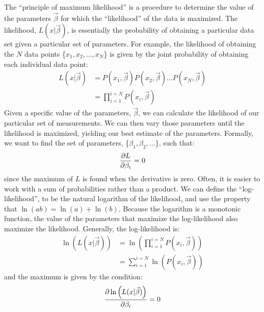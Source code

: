The ``principle of maximum likelihood'' is a procedure to determine the value of the parameters $\vec\beta$ for which the ``likelihood'' of the data is maximized. The likelihood, $L(x|\vec\beta)$, is essentially the probability of obtaining a particular data set given a particular set of parameters. For example, the likelihood of obtaining the $N$ data points \{$x_1, x_2, \dots,x_N$\} is given by the joint probability of obtaining each individual data point:
\begin{align}
L(x|\vec\beta)&=P(x_1,\vec\beta)P(x_2,\vec\beta)\dots P(x_N,\vec\beta)\nonumber\\
&=\prod_{i=1}^{i=N}P(x_i,\vec\beta)
\end{align}
Given a specific value of the parameters, $\vec\beta$, we can calculate the likelihood of our particular set of measurements. We can then vary those parameters until the likelihood is maximized, yielding our best estimate of the parameters. Formally, we want to find the set of parameters, \{$\beta_1,\beta_2,\dots$\}, such that:
\begin{align}
\frac{\partial L}{\partial \beta_i}=0
\end{align}
since the maximum of $L$ is found when the derivative is zero. Often, it is easier to work with a sum of probabilities rather than a product. We can define the ``log-likelihood'', to be the natural logarithm of the likelihood, and use the property that $\ln(ab)=\ln(a)+\ln(b)$. Because the logarithm is a monotonic function, the value of the parameters that maximize the log-likelihood also maximize the likelihood. Generally, the log-likelihood is:
\begin{align*}
\ln \left(L(x|\vec\beta)\right) &= \ln \left( \prod_{i=1}^{i=N}P(x_i,\vec\beta) \right) \\
& = \sum_{i=1}^{i=N} \ln\left(P(x_i,\vec\beta)\right)
\end{align*}
and the maximum is given by the condition:
\begin{align}
\frac{\partial \ln \left(L(x|\vec\beta)\right)}{\partial \beta_i}=0
\end{align}

